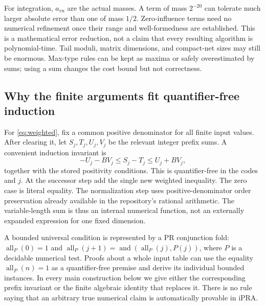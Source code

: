 For integration, $a_{vu}$ are the actual masses. A term of mass $2^{-20}$
can tolerate much larger absolute error than one of mass $1/2$.
Zero-influence terms need no numerical refinement once their range and
well-formedness are established. This is a mathematical error reduction,
not a claim that every resulting algorithm is polynomial-time. Tail
moduli, matrix dimensions, and compact-net sizes may still be enormous.
Max-type rules can be kept as maxima or safely overestimated by sums;
using a sum changes the cost bound but not correctness.

\subsection{Why the finite arguments fit quantifier-free induction}

For \eqref{eq:weighted}, fix a common positive denominator for all finite
input values. After clearing it, let $S_j,T_j,U_j,V_j$ be the relevant
integer prefix sums. A convenient induction invariant is
\[
 -U_j-BV_j\le S_j-T_j\le U_j+BV_j,
\]
together with the stored positivity conditions. This is quantifier-free
in the codes and $j$. At the successor step add the single new weighted
inequality. The zero case is literal equality. The normalization step uses
positive-denominator order preservation already available in the
repository's rational arithmetic. The variable-length sum is thus an
internal numerical function, not an externally expanded expression for
one fixed dimension.

A bounded universal condition is represented by a PR conjunction fold:
$\operatorname{all}_P(0)=1$ and
$\operatorname{all}_P(j+1)=\operatorname{and}
(\operatorname{all}_P(j),P(j))$, where $P$ is a decidable numerical test.
Proofs about a whole input table can use the equality
$\operatorname{all}_P(n)=1$ as a quantifier-free premise and derive its
individual bounded instances. In every main construction below we give
either the corresponding prefix invariant or the finite algebraic identity
that replaces it. There is no rule saying that an arbitrary true numerical
claim is automatically provable in iPRA.
